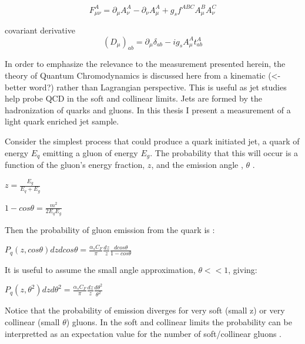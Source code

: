 \begin{equation}
F_{\mu \nu}^{A}=\partial_{\mu} A_{\nu}^{A}-\partial_{\nu} A_{\mu}^{A}+g_{s} f^{A B C} A_{\mu}^{B} A_{\nu}^{C}
\end{equation}

covariant derivative
\begin{equation}
\left(D_{\mu}\right)_{a b}=\partial_{\mu} \delta_{a b}-i g_{s} A_{\mu}^{A} t_{a b}^{A}
\end{equation}

In order to emphasize the relevance to the measurement presented herein, the theory of Quantum Chromodynamics is discussed here from a kinematic (<- better word?) rather than Lagrangian perspective. This is useful as jet studies help probe QCD in the soft and collinear limits. 
Jets are formed by the hadronization of quarks and gluons. In this thesis I present a measurement of a light quark enriched jet sample. 



Consider the simplest process that could produce a quark initiated jet, a quark of energy $E_q$  emitting a gluon of energy $E_g$. The probability that this will occur is a function of the gluon's energy fraction, $z$, and the emission angle , $\theta$  \cite{Larkoski:2017fip}.\newline


$z = \frac{E_g}{E_q + E_g}$\newline

$1 - cos \theta = \frac{m^2}{2 E_q E_g}$\newline

Then the probability of gluon emission from the quark is :


$P_q(z,cos \theta) dz d cos \theta = \frac{\alpha_s C_F}{\pi}  \frac{dz}{z} \frac{dcos \theta}{1 - cos \theta}  $\newline

It is useful to assume the small angle approximation, $\theta << 1$, giving:\newline


$P_q(z,\theta^2) dz d \theta^2 = \frac{\alpha_s C_F}{\pi}  \frac{dz}{z} \frac{d \theta^2}{ \theta^2}  $\newline

Notice that the probability of emission diverges for very soft (small z) or very collinear (small $\theta$) gluons. In the soft and collinear limits the probability can be interpretted as an expectation value for the number of soft/collinear gluons \cite{Larkoski:2017fip}.

